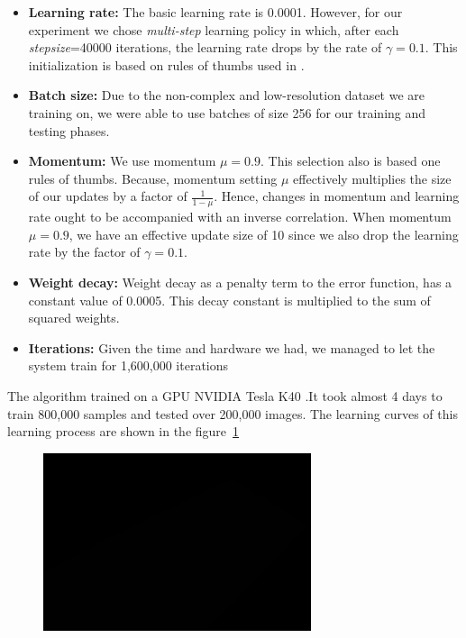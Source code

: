 \begin{itemize}
\item \textbf{Learning rate:} The basic learning rate is 0.0001. However, for our experiment we chose \textit{multi-step} learning policy in which, after each \textit{stepsize}=40000 iterations, the learning rate drops by the rate of $\gamma = 0.1$. This initialization is based on rules of thumbs used in \cite{krizhevsky2012imagenet}.
\item \textbf{Batch size:} Due to the non-complex and low-resolution dataset we are training on, we were able to use batches of size 256 for our training and testing phases.
\item \textbf{Momentum:} We use momentum $\mu = 0.9$. This selection also is based one rules of thumbs. Because, momentum setting $\mu$ effectively multiplies the size of our updates by a factor of $\frac{1}{1-\mu}$. Hence, changes in momentum and learning rate ought to be accompanied with an inverse correlation. When momentum $\mu = 0.9$, we have an effective update size of 10 since we also drop the learning rate by the factor of $\gamma= 0.1$.
\item \textbf{Weight decay:} Weight decay as a penalty term to the error function, has a constant value of 0.0005. This decay constant is multiplied to the sum of squared weights.
\item \textbf{Iterations:} Given the time and hardware we had, we managed to let the system train for 1,600,000 iterations
\end{itemize}

\noindent The algorithm trained on a GPU NVIDIA \cite{kirk2007nvidia} Tesla K40 \cite{lindholm2008nvidia}.It took almost 4 days to train 800,000 samples and tested over 200,000 images. The learning curves of this learning process are shown in the figure~\ref{fig:curve}

\begin{figure}[H]
	\centering
	{\includegraphics[width=0.7\textwidth]{images/1}}
	\caption{}
	\label{fig:curve}
\end{figure}

